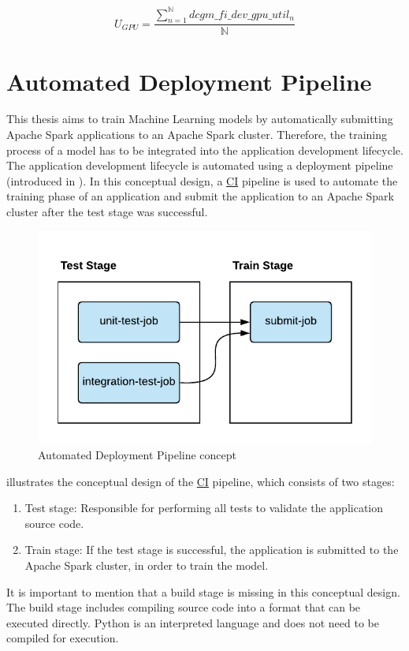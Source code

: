 \begin{equation}
U_{GPU} = \dfrac{\sum_{n=1}^{\mathbb{N}}dcgm\_fi\_dev\_gpu\_util_{n}}{\mathbb{N}}
\label{eq:05_metrics_gpu}
\end{equation}


\section{Automated Deployment Pipeline}
\label{sec:05_pipeline}
This thesis aims to train Machine Learning models by automatically submitting Apache Spark applications to an Apache Spark cluster. Therefore, the training process of a model has to be integrated into the application development lifecycle.
%
The application development lifecycle is automated using a deployment pipeline (introduced in ).
%
In this conceptual design, a \hyperlink{abbr:ci}{CI} pipeline is used to automate the training phase of an application and submit the application to an Apache Spark cluster after the test stage was successful.


\begin{figure}[h]
\centering
\includegraphics[scale=1]{images/05_conceptual_design/automated_deployment_pipeline/ci_cd_concept}
\caption{Automated Deployment Pipeline concept}
\label{fig:05_deployment_concept}
\end{figure}
 illustrates the conceptual design of the \hyperlink{abbr:ci}{CI} pipeline, which consists of two stages:
\begin{enumerate}
\item Test stage: Responsible for performing all tests to validate the application source code.
\item Train stage: If the test stage is successful, the application is submitted to the Apache Spark cluster, in order to train the model.
\end{enumerate}
It is important to mention that a build stage is missing in this conceptual design. The build stage includes compiling source code into a format that can be executed directly.
Python is an interpreted language and does not need to be compiled for execution.


